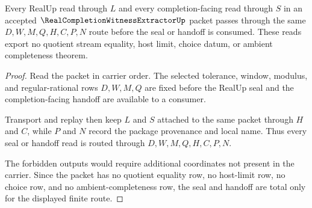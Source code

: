 \begin{theorem}
\label{thm:real-completion-witness-extractor-seal-handoff-totality}
Every RealUp read through $L$ and every completion-facing read through $S$ in
an accepted $\RealCompletionWitnessExtractorUp$ packet passes through the same
$D,W,M,Q,H,C,P,N$ route before the seal or handoff is consumed. These reads
export no quotient stream equality, host limit, choice datum, or ambient
completeness theorem.
\end{theorem}
\begin{proof}
Read the packet in carrier order. The selected tolerance, window, modulus, and
regular-rational rows $D,W,M,Q$ are fixed before the RealUp seal and the
completion-facing handoff are available to a consumer.

Transport and replay then keep $L$ and $S$ attached to the same packet through
$H$ and $C$, while $P$ and $N$ record the package provenance and local name.
Thus every seal or handoff read is routed through $D,W,M,Q,H,C,P,N$.

The forbidden outputs would require additional coordinates not present in the
carrier. Since the packet has no quotient equality row, no host-limit row, no
choice row, and no ambient-completeness row, the seal and handoff are total
only for the displayed finite route.
\end{proof}


